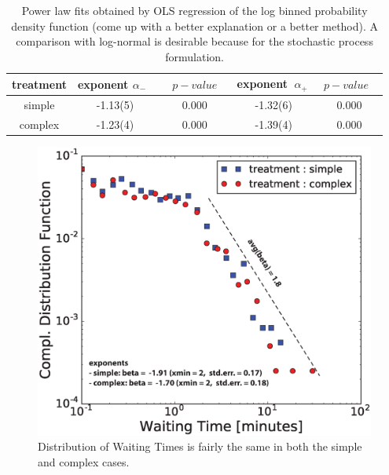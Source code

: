\begin{table}
  \centering 
  \begin{tabular}{|c|c|c|c|c|}
	\hline
   treatment & exponent $\alpha_{-}$~&~$~p-value~$~& exponent $~\alpha_{+}~$ & $~p-value~$~\\
   \hline
  simple  & -1.13(5) & 0.000 &  -1.32(6) & 0.000\\
  complex &  -1.23(4) & 0.000 & -1.39(4) & 0.000\\
\hline
\end{tabular}
  \caption{Power law fits obtained by OLS regression of the log binned probability density function (come up with a better explanation or a better method). A comparison with log-normal is desirable because for the stochastic process formulation.}
  \label{pwlaw_fits}
\end{table}

\begin{figure}[h!]
\begin{center}
\includegraphics[width=15cm]{figures/ccdf_waiting_time.eps}
\caption{Distribution of Waiting Times is fairly the same in both the simple and complex cases.}
\label{fig:waiting_times}
\end{center}
\end{figure}

